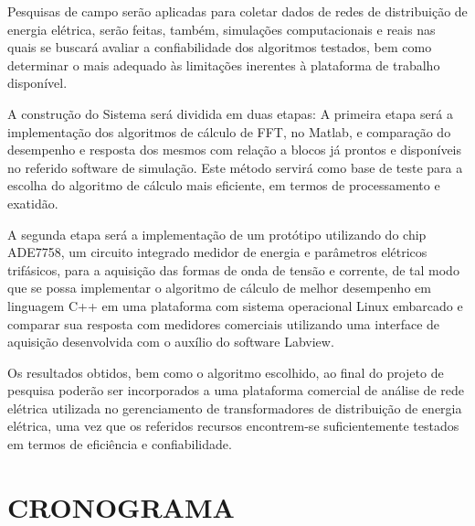 \documentclass[
	12pt,				%
	openright,			%
	oneside,			%
	a4paper,			%
	chapter=TITLE,		%
	english,			%
	french,				%
	spanish,			%
	brazil,				%
	article,			%
	]{uea-abntex2}
\begin{document}
Pesquisas de campo serão aplicadas para coletar dados de redes de distribuição de energia elétrica, serão feitas, também, simulações computacionais e reais nas quais se buscará avaliar a confiabilidade dos algoritmos testados, bem como determinar o mais adequado às limitações inerentes à plataforma de trabalho disponível.

A construção do Sistema será dividida em duas etapas: A primeira etapa será a implementação dos algoritmos de cálculo de FFT, no Matlab, e comparação do desempenho e resposta dos mesmos com relação a blocos já prontos e disponíveis no referido software de simulação. Este método servirá como base de teste para a escolha do algoritmo de cálculo mais eficiente, em termos de processamento e exatidão.

A segunda etapa será a implementação de um protótipo utilizando do chip ADE7758, um circuito integrado medidor de energia e parâmetros elétricos trifásicos, para a aquisição das formas de onda de tensão e corrente, de tal modo que se possa implementar o algoritmo de cálculo de melhor desempenho em linguagem C++ em uma plataforma com sistema operacional Linux embarcado e comparar sua resposta com medidores comerciais utilizando uma interface de aquisição desenvolvida com o auxílio do software Labview.

Os resultados obtidos, bem como o algoritmo escolhido, ao final do projeto de pesquisa poderão ser incorporados a uma plataforma comercial de análise de rede elétrica utilizada no gerenciamento de transformadores de distribuição de energia elétrica, uma vez que os referidos recursos encontrem-se suficientemente testados em termos de eficiência e confiabilidade.


\newpage

\section{CRONOGRAMA}
\end{document}
